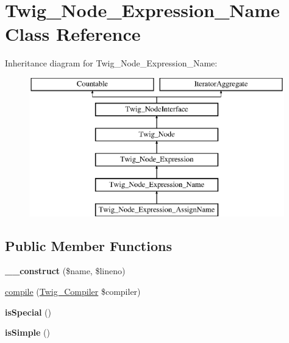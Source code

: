 \hypertarget{class_twig___node___expression___name}{}\section{Twig\+\_\+\+Node\+\_\+\+Expression\+\_\+\+Name Class Reference}
\label{class_twig___node___expression___name}
Inheritance diagram for Twig\+\_\+\+Node\+\_\+\+Expression\+\_\+\+Name\+:\begin{figure}[H]
\begin{center}
\leavevmode
\includegraphics[height=6.000000cm]{class_twig___node___expression___name}
\end{center}
\end{figure}
\subsection*{Public Member Functions}
\begin{DoxyCompactItemize}
\item 
\hypertarget{class_twig___node___expression___name_ae217ce26c809152fd385490096a36b75}{}{\bfseries \+\_\+\+\_\+construct} (\$name, \$lineno)\label{class_twig___node___expression___name_ae217ce26c809152fd385490096a36b75}

\item 
\hyperlink{class_twig___node___expression___name_a4e0faa87c3fae583620b84d3607085da}{compile} (\hyperlink{class_twig___compiler}{Twig\+\_\+\+Compiler} \$compiler)
\item 
\hypertarget{class_twig___node___expression___name_aa7e150f528378b8f7268e1ae27ebb1af}{}{\bfseries is\+Special} ()\label{class_twig___node___expression___name_aa7e150f528378b8f7268e1ae27ebb1af}

\item 
\hypertarget{class_twig___node___expression___name_a270d6ef7fb3863dbd4d27027b21f6ecb}{}{\bfseries is\+Simple} ()\label{class_twig___node___expression___name_a270d6ef7fb3863dbd4d27027b21f6ecb}

\end{DoxyCompactItemize}
